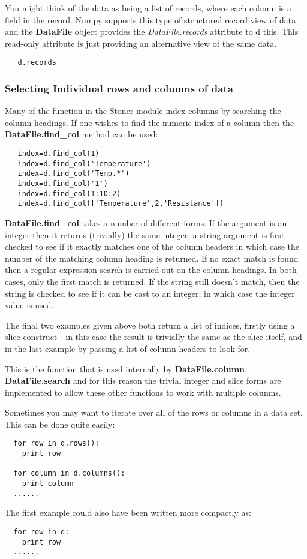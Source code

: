\documentclass[a4paper,11pt]{scrartcl}
\begin{document}
You might think of the data as being a list of records, where each column is a
field in the record. Numpy supports this type of structured record view of data
and the \textbf{DataFile} object provides the \textit{DataFile.records}
attribute to d this. This read-only attribute is just providing an alternative
view of the same data.

\begin{lstlisting}
   d.records
\end{lstlisting}

\subsubsection{Selecting Individual rows and columns of data}

Many of the function in the Stoner module index columns by searching the column
headings. If one wishes to find the numeric index of a column then the
\textbf{DataFile.find\_col} method can be used:

\begin{lstlisting}
   index=d.find_col(1)
   index=d.find_col('Temperature')
   index=d.find_col('Temp.*')
   index=d.find_col('1')
   index=d.find_col(1:10:2)
   index=d.find_col(['Temperature',2,'Resistance'])
\end{lstlisting}

 \textbf{DataFile.find\_col} takes a number of different forms. If the argument
is an integer then it returns (trivially) the same integer, a string argument is
first checked to see if it exactly matches one of the column headers in which
case the number of the matching column heading is returned. If no exact match is
found then a regular expression search is carried out on the column headings. In
both cases, only the first match is returned. If the string still doesn't match, then
the string is checked to see if it can be cast to an integer, in which case the integer value is used.

The final two examples given above
both return a list of indices, firstly using a slice construct - in this case
the result is trivially the same as the slice itself, and in the last example by
passing a list of column headers to look for.

This is the function that is used internally by \textbf{DataFile.column},
\textbf{DataFile.search} \etc and for this reason the trivial integer and slice
forms are implemented to allow these other functions to work with multiple
columns.

Sometimes you may want to iterate over all of the rows or columns in a data set.
This can be done quite easily:
\begin{lstlisting}
  for row in d.rows():
  	print row

  for column in d.columns():
  	print column
  ......
\end{lstlisting}
The first example could also have been written more compactly as:
\begin{lstlisting}
  for row in d:
  	print row
  ......
\end{lstlisting}
\end{document}
